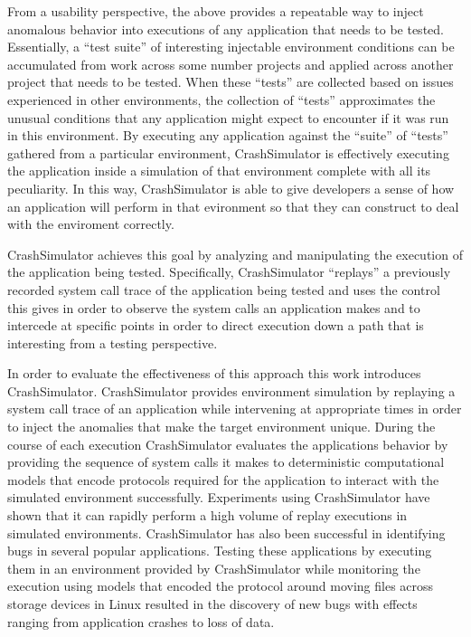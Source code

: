 From a usability perspective, the above provides a repeatable way to inject anomalous behavior into executions of any
application that needs to be tested.  Essentially, a ``test suite'' of interesting injectable environment conditions can
be accumulated from work across some number projects and applied across another project that needs to be tested.  When
these ``tests'' are collected based on issues experienced in other environments, the collection of ``tests''
approximates the unusual conditions that any application might expect to encounter if it was run in this environment.
By executing any application against the ``suite'' of ``tests'' gathered from a particular environment, CrashSimulator
is effectively executing the application inside a simulation of that environment complete with all its peculiarity.  In
this way, CrashSimulator is able to give developers a sense of how an application will perform in that evironment so
that they can construct to deal with the enviroment correctly.

CrashSimulator achieves this goal by analyzing and manipulating the execution of the application being tested.
Specifically, CrashSimulator ``replays'' a previously recorded system call trace of the application being tested and
uses the control this gives in order to observe the system calls an application makes and to intercede at specific
points in order to direct execution down a path that is interesting from a testing perspective.

In order to evaluate the effectiveness of this approach this work introduces CrashSimulator.  CrashSimulator provides
environment simulation by replaying a system call trace of an application while intervening at appropriate times in
order to inject the anomalies that make the target environment unique.  During the course of each execution
CrashSimulator evaluates the applications behavior by providing the sequence of system calls it makes to deterministic
computational models that encode protocols required for the application to interact with the simulated environment
successfully.  Experiments using CrashSimulator have shown that it can rapidly perform a high volume of replay
executions in simulated environments.  CrashSimulator has also been successful in identifying bugs in several popular
applications.  Testing these applications by executing them in an environment provided by CrashSimulator while
monitoring the execution using models that encoded the protocol around moving files across storage devices in Linux
resulted in the discovery of new bugs with effects ranging from application crashes to loss of data.

